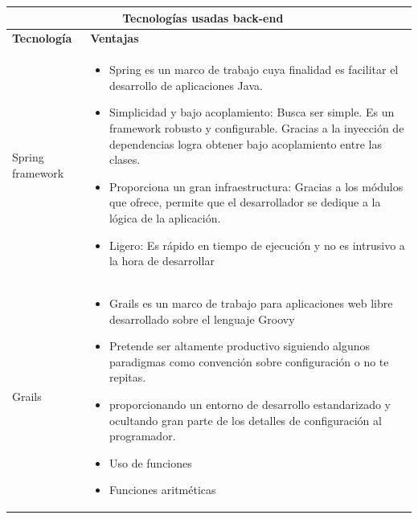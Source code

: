 \newpage
\begin{table}[b!]
	\centering
	\vspace{10mm}  
	\begin{tabular}{|p{2cm}|ll}
		\hline
		\multicolumn{2}{|c|}{{\bf Tecnologías usadas back-end}} \\ 
		\hline
		\multicolumn{1}{|p{4cm}|}{{\bf Tecnología}} &   
		\multicolumn{1}{p{10cm}|}{{\bf Ventajas}}\\
		\hline
		\multicolumn{1}{|p{5cm}|}{Spring framework}  &   
		\multicolumn{2}{p{10cm}|}{\begin{itemize}
		\vspace{-5mm}
		\item Spring es un marco de trabajo cuya finalidad es facilitar el
		desarrollo de aplicaciones Java.
		\item  Simplicidad y bajo acoplamiento: Busca ser simple. Es un
		framework robusto y configurable. Gracias a la inyección de
		dependencias logra obtener bajo acoplamiento entre las clases.
		\item  Proporciona un gran infraestructura: Gracias a los módulos
		que ofrece, permite que el desarrollador se dedique a la
		lógica de la aplicación.
		\item  Ligero: Es rápido en tiempo de ejecución y no es intrusivo a
		la hora de desarrollar
		\end{itemize}} \\
		        
		\hline
		\multicolumn{1}{|p{5cm}|}{Grails}            &   
		\multicolumn{1}{p{10cm}|}{
		\begin{itemize}
		\vspace{10mm}
		\item Grails es un marco de trabajo para aplicaciones web libre
		desarrollado sobre el lenguaje Groovy            
		\item Pretende ser altamente productivo siguiendo algunos paradigmas
		como convención sobre configuración o no te repitas.
		\item  proporcionando un entorno de desarrollo estandarizado y
		ocultando gran parte de los detalles de configuración al
		programador.
		\item Uso de funciones
		\item Funciones aritméticas
		\end{itemize}} \\
		\hline
	\end{tabular}
	\label{table: tecnologias usadas}
\end{table}

